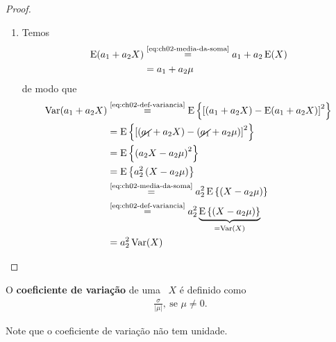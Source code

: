 \begin{property}
\begin{proof}
\begin{enumerate}
            \item Temos \begin{align*}
                \Expected(a_1 + a_2 X)
                &\overset{\text{\Cref{eq:ch02-media-da-soma}}}{=}
                a_1 + a_2 \Expected(X) \\
                &= a_1 + a_2 \mu
            \end{align*}
            de modo que
            \begin{align*}
                \Var(a_1 + a_2 X)
                &\overset{\text{\Cref{eq:ch02-def-variancia}}}{=}
                \Expected\left\{
                    \left[
                        (a_1 + a_2 X)
                        - \Expected(a_1 + a_2 X)
                    \right]^2
                \right\} \\
                &= \Expected\left\{
                    \left[
                        (\cancel{a_1} + a_2 X)
                        - (\cancel{a_1} + a_2 \mu)
                    \right]^2
                \right\} \\
                &= \Expected\left\{
                    \left(a_2 X - a_2 \mu\right)^2
                \right\} \\
                &= \Expected\left\{
                    a_2^2 \left( X - a_2 \mu\right)
                \right\} \\
                &\overset{\text{\Cref{eq:ch02-media-da-soma}}}{=}
                a_2^2 \Expected\left\{
                    \left( X - a_2 \mu\right)
                \right\} \\
                &\overset{\text{\Cref{eq:ch02-def-variancia}}}{=}
                a_2^2 \underbrace{\Expected\left\{
                    \left( X - a_2 \mu\right)
                \right\}}_{=\Var(X)} \\
                &= a_2^2 \Var(X)
            \end{align*}
        \end{enumerate}
    \end{proof}
\end{property}

\begin{definition}
    O \textbf{coeficiente de variação} de uma \va\ $X$
    é definido como
    \begin{align}
        \frac{\sigma}{|\mu|},\ \text{se }\mu \neq 0.
    \end{align}

    Note que o coeficiente de variação não tem unidade.
\end{definition}

